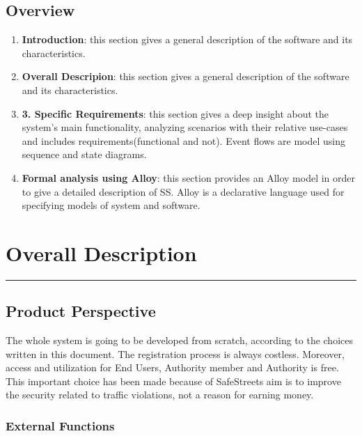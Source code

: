 \documentclass[12pt]{article}
\begin{document}
\subsection{Overview}
\vspace{2mm}
\begin{enumerate}
\item \textbf{Introduction}: this section gives a general description of the software  and its characteristics.

\item \textbf{Overall Descripion}: this section gives a general description of the software  and its characteristics.

\item \textbf{3.    Specific Requirements}: this section gives a deep insight about the system’s main functionality, analyzing scenarios with their relative use-cases and includes requirements(functional and not). Event flows are model using sequence and state diagrams. 

\item \textbf{Formal analysis using Alloy}: this section provides an Alloy model in order to give a detailed description of SS. Alloy is a declarative language used for specifying models of system and software.


\end{enumerate}

\newpage

\section{Overall Description}
\hrule
\vspace{8mm}

\subsection{Product Perspective}
\vspace{5mm}

The whole system is going to be developed from scratch, according to the choices written in this document. The registration process is always costless. Moreover, access and utilization for End Users, Authority member and Authority is free. This important choice has been made because of SafeStreets aim is to improve the security related to traffic violations, not a reason for earning money. 

\subsubsection{External Functions}
\vspace{2mm}
\end{document}
